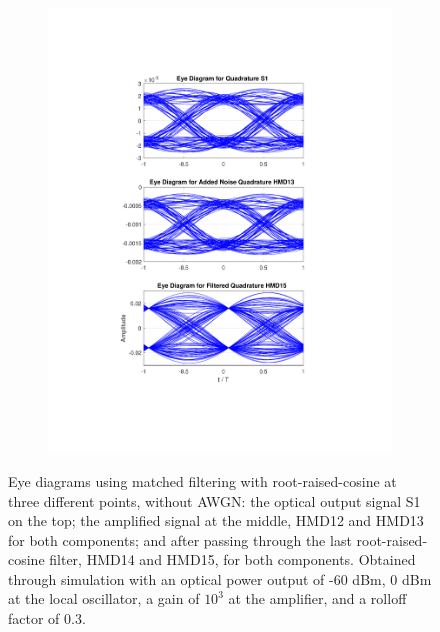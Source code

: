 \begin{figure}[H]
\begin{subfigure}{.45\textwidth}
		\includegraphics[clip, trim=5cm 4cm 5cm 4cm, width=\textwidth]{./sdf/m_qam_system/figures/eyes/q_nn_p_60_03.pdf}
	\end{subfigure}
	
	\caption{Eye diagrams using matched filtering with root-raised-cosine at three different points, without AWGN: the optical output signal S1 on the top; the amplified signal at the middle, HMD12 and HMD13 for both components; and after passing through the last root-raised-cosine filter, HMD14 and HMD15, for both components. Obtained through simulation with an optical power output of -60 dBm, 0 dBm at the local oscillator, a gain of $10^3$ at the amplifier, and a rolloff factor of 0.3.\label{fig:eyes_nn_rrc_03}}
	
\end{figure}

